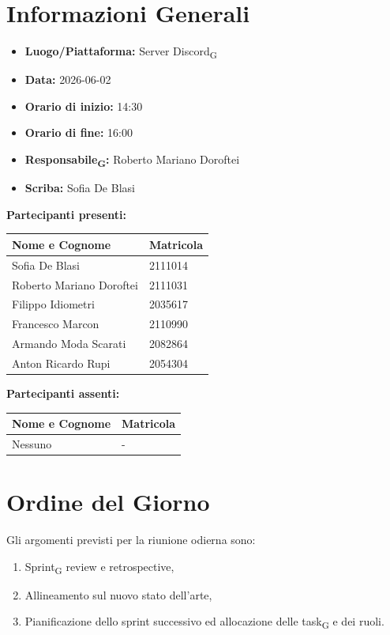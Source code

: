 \section{Informazioni Generali}
\begin{itemize}
	\item \textbf{Luogo/Piattaforma:} Server Discord\textsubscript{G}
	\item \textbf{Data:} 2026-06-02
	\item \textbf{Orario di inizio:} 14:30
	\item \textbf{Orario di fine:} 16:00
	\item \textbf{Responsabile\textsubscript{G}:} Roberto Mariano Doroftei
	\item \textbf{Scriba:} Sofia De Blasi
\end{itemize}

\vspace{0.5cm}
\textbf{Partecipanti presenti:}
\begin{table}[ht]
	\centering
	\renewcommand{\arraystretch}{1.2}
	\begin{tabularx}{\textwidth}{X l}
		\toprule
		\textbf{Nome e Cognome} & \textbf{Matricola} \\
		\midrule
		Sofia De Blasi & 2111014 \\
		Roberto Mariano Doroftei & 2111031 \\
		Filippo Idiometri & 2035617 \\
		Francesco Marcon & 2110990 \\
		Armando Moda Scarati & 2082864 \\
		Anton Ricardo Rupi & 2054304 \\
		\bottomrule
	\end{tabularx}
\end{table}

\vspace{0.5cm}
\textbf{Partecipanti assenti:}
\begin{table}[ht]
	\centering
	\renewcommand{\arraystretch}{1.2}
	\begin{tabularx}{\textwidth}{X l}
		\toprule
		\textbf{Nome e Cognome} & \textbf{Matricola} \\
		\midrule
		Nessuno & - \\
		\bottomrule
	\end{tabularx}
\end{table}

\section{Ordine del Giorno}
Gli argomenti previsti per la riunione odierna sono:
\begin{enumerate}
	\item Sprint\textsubscript{G} review e retrospective,
	\item Allineamento sul nuovo stato dell'arte,
	\item Pianificazione dello sprint successivo ed allocazione delle task\textsubscript{G} e dei ruoli.
\end{enumerate}

